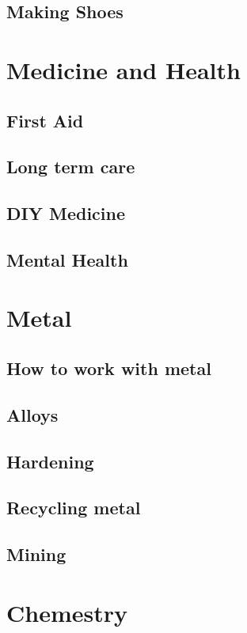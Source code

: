 \documentclass[ebook,12pt,oneside,openany]{memoir}
\begin{document}
\section{Making Shoes}





\chapter{Medicine and Health}
\section{First Aid}
\section{Long term care}
\section{DIY Medicine}
\section{Mental Health}



\chapter{Metal}
\section{How to work with metal}
\section{Alloys}
\section{Hardening}
\section{Recycling metal}
\section{Mining}


\chapter{Chemestry}
\end{document}
